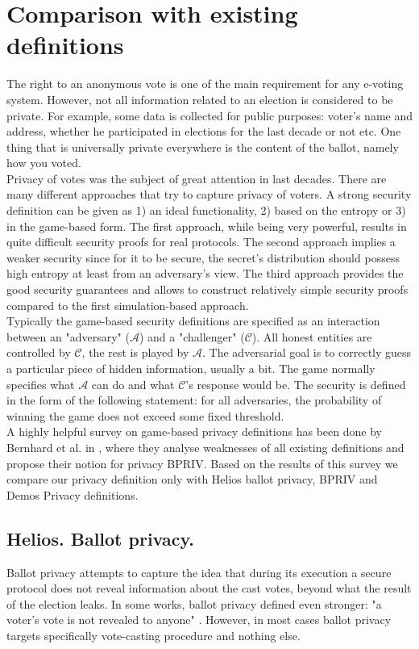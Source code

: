  \section{Comparison with existing definitions}
The right to an anonymous vote is one of the main requirement for any e-voting system. However, not all information related to an election is considered to be private. For example, some data is collected for public purposes: voter's name and address, whether he participated in elections for the last decade or not etc.  One thing that is universally private everywhere is the content of the ballot, namely how you voted.\\

 Privacy of votes was the subject of great attention in last decades. There are many different approaches that try to capture privacy of voters. A strong security definition can be given  as 1) an ideal functionality, 2) based on the entropy or 3) in the game-based form. The first approach, while being very powerful, results in quite difficult security proofs for real protocols. The second approach implies a weaker security since for it to be secure, the secret's distribution should possess high entropy at least from an adversary's view. The third approach provides the good security guarantees and allows to construct relatively simple security proofs compared to the first simulation-based approach.\\
 
Typically the game-based security definitions are specified as an interaction between  an "adversary" ($\mathcal{A}$) and a "challenger" ($\mathcal{C}$). All honest entities are controlled by $\mathcal{C}$, the rest is played by $\mathcal{A}$. The adversarial goal is to correctly guess a particular piece of hidden information, usually a bit. The game normally specifies what $\mathcal{A}$ can do and what $\mathcal{C}$'s response would be.  The security is defined in the form of the following statement: for all adversaries, the probability of winning the game does not exceed some fixed threshold.\\

A highly helpful survey on game-based privacy definitions has been done by Bernhard et al. in \cite{Bernhard2015}, where they analyse weaknesses of all existing definitions and propose their notion for privacy BPRIV. Based on the results of this survey we compare our privacy definition only with Helios ballot privacy, BPRIV and Demos Privacy definitions. 
 \subsection{Helios. Ballot privacy.}
 Ballot privacy attempts to capture the idea that during its execution a secure protocol does not reveal information about the cast votes, beyond what the result of the election leaks. In some works, ballot privacy defined even stronger: "a voter's vote is not revealed to anyone" \cite{Bernhard2011}. However, in most cases ballot privacy targets specifically vote-casting procedure  and nothing else.\\ 
  
